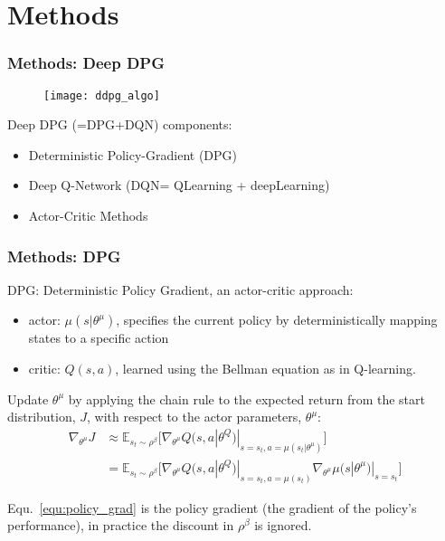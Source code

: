 \section{Methods}

\begin{frame}
\frametitle{Methods: Deep DPG}
\begin{figure}
    \centering
    \texttt{[image: ddpg\_algo]}
\end{figure}

{\footnotesize
Deep DPG (=DPG+DQN) components:
\begin{itemize}
  \item Deterministic Policy-Gradient (DPG) \cite{Silver2014}
  \item Deep Q-Network (DQN= QLearning + deepLearning) {\scriptsize\cite{Mnih2013}}
  \item Actor-Critic Methods \cite{Sutton1998}
\end{itemize}
}
\end{frame}

\begin{frame}
\frametitle{Methods: DPG \cite{Silver2014}}

DPG: Deterministic Policy Gradient, an actor-critic approach:
\begin{itemize}
  \item actor: $\mu (s|\theta^{\mu})$,
  specifies the current policy by deterministically mapping states to a specific action
  \item critic: $Q(s, a)$,
  learned using the Bellman equation as in Q-learning.
\end{itemize}
\vspace{3mm}

Update $\theta^{\mu}$ by applying the chain rule to the expected return from
the start distribution, $J$, with respect to the actor parameters, $\theta^{\mu}$:
\begin{equation} \label{equ:policy_grad}
\begin{split}
\nabla_{\theta^{\mu}} J &  \approx \mathbb{E}_{s_t \sim \rho^{\beta}} \Big[ \nabla_{\theta^{\mu}} Q(s,a|\theta^Q) |_{s = s_t, a = \mu(s_t|\theta^{\mu})} \Big] \\
  & = \mathbb{E}_{s_t \sim \rho^{\beta}} \Big[ \nabla_{\theta^{\mu}} Q(s,a|\theta^Q) |_{s = s_t, a = \mu(s_t)} \nabla_{\theta^{\mu}} \mu(s|\theta^{\mu})|_{s = s_t} \Big]
\end{split}
\end{equation}

Equ.~\ref{equ:policy_grad} is the policy gradient (the gradient of the policy's performance),
in practice the discount in $\rho^{\beta}$ is ignored.
\end{frame}

